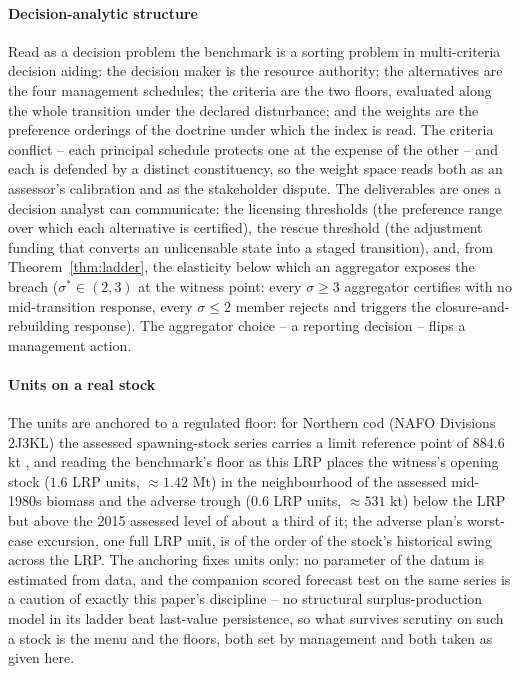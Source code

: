 \paragraph{Decision-analytic structure} Read as a decision problem the benchmark is a sorting problem in multi-criteria decision aiding: the decision maker is the resource authority; the alternatives are the four management schedules; the criteria are the two floors, evaluated along the whole transition under the declared disturbance; and the weights are the preference orderings of the doctrine under which the index is read. The criteria conflict -- each principal schedule protects one at the expense of the other -- and each is defended by a distinct constituency, so the weight space reads both as an assessor's calibration and as the stakeholder dispute. The deliverables are ones a decision analyst can communicate: the licensing thresholds (the preference range over which each alternative is certified), the rescue threshold (the adjustment funding that converts an unlicensable state into a staged transition), and, from Theorem~\ref{thm:ladder}, the elasticity below which an aggregator exposes the breach ($\sigma^*\in(2,3)$ at the witness point: every $\sigma\ge3$ aggregator certifies with no mid-transition response, every $\sigma\le2$ member rejects and triggers the closure-and-rebuilding response). The aggregator choice -- a reporting decision -- flips a management action.

\paragraph{Units on a real stock} The units are anchored to a regulated floor: for Northern cod (NAFO Divisions 2J3KL) the assessed spawning-stock series carries a limit reference point of $884.6$ kt \citep{DFO2016}, and reading the benchmark's floor as this LRP places the witness's opening stock ($1.6$ LRP units, $\approx1.42$ Mt) in the neighbourhood of the assessed mid-1980s biomass and the adverse trough ($0.6$ LRP units, $\approx531$ kt) below the LRP but above the 2015 assessed level of about a third of it; the adverse plan's worst-case excursion, one full LRP unit, is of the order of the stock's historical swing across the LRP. The anchoring fixes units only: no parameter of the datum is estimated from data, and the companion scored forecast test on the same series \citep{Abaee2026cod} is a caution of exactly this paper's discipline -- no structural surplus-production model in its ladder beat last-value persistence, so what survives scrutiny on such a stock is the menu and the floors, both set by management and both taken as given here.

